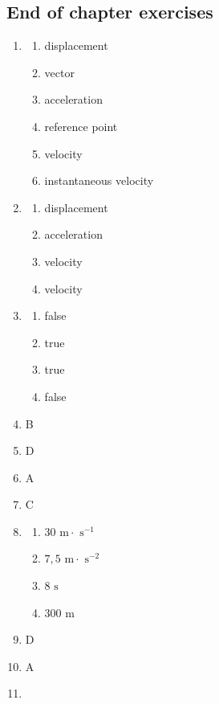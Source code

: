 \subsection{End of chapter exercises}
\begin{multicols}{3}
 \begin{enumerate}[noitemsep, label=\textbf{(\arabic*)} ]
  \item 
\begin{enumerate}[noitemsep, label=\textbf{(\alph*)} ]
 \item displacement
\item vector
\item acceleration
\item reference point
\item velocity
\item instantaneous velocity
\end{enumerate}
\item 
\begin{enumerate}[noitemsep, label=\textbf{(\alph*)} ]
 \item displacement
\item acceleration
\item velocity
\item velocity
\end{enumerate}
\item 
\begin{enumerate}[noitemsep, label=\textbf{(\alph*)} ]
 \item false
\item true
\item true
\item false
\end{enumerate}
\item B 
\item D
\item A
\item C
\item 
\begin{enumerate}[noitemsep, label=\textbf{(\alph*)} ]
 \item $30 \text{ m} \cdot \text{ s}^{-1}$
\item $7,5 \text{ m} \cdot \text{ s}^{-2}$
\item $8 \text{ s}$
\item $300 \text{ m}$
\end{enumerate}
\item D
\item A
\item 
\begin{enumerate}[noitemsep, label=\textbf{(\alph*)} ]

\end{enumerate}
\end{enumerate}
\end{multicols}
